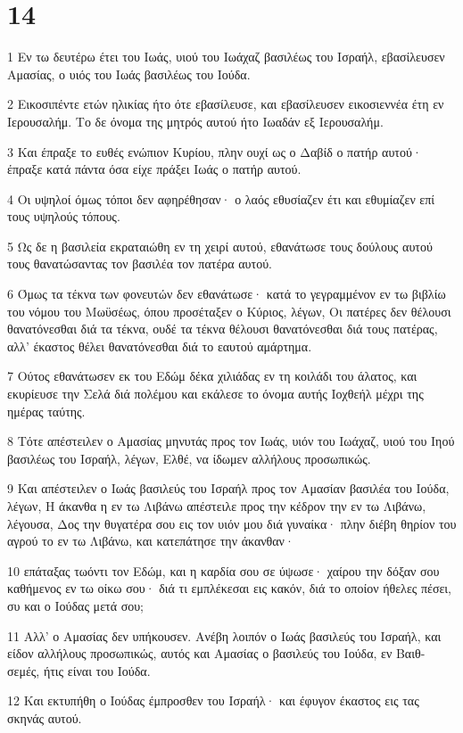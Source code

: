 \chapter{14}

\par 1 Εν τω δευτέρω έτει του Ιωάς, υιού του Ιωάχαζ βασιλέως του Ισραήλ, εβασίλευσεν Αμασίας, ο υιός του Ιωάς βασιλέως του Ιούδα.
\par 2 Εικοσιπέντε ετών ηλικίας ήτο ότε εβασίλευσε, και εβασίλευσεν εικοσιεννέα έτη εν Ιερουσαλήμ. Το δε όνομα της μητρός αυτού ήτο Ιωαδάν εξ Ιερουσαλήμ.
\par 3 Και έπραξε το ευθές ενώπιον Κυρίου, πλην ουχί ως ο Δαβίδ ο πατήρ αυτού· έπραξε κατά πάντα όσα είχε πράξει Ιωάς ο πατήρ αυτού.
\par 4 Οι υψηλοί όμως τόποι δεν αφηρέθησαν· ο λαός εθυσίαζεν έτι και εθυμίαζεν επί τους υψηλούς τόπους.
\par 5 Ως δε η βασιλεία εκραταιώθη εν τη χειρί αυτού, εθανάτωσε τους δούλους αυτού τους θανατώσαντας τον βασιλέα τον πατέρα αυτού.
\par 6 Όμως τα τέκνα των φονευτών δεν εθανάτωσε· κατά το γεγραμμένον εν τω βιβλίω του νόμου του Μωϋσέως, όπου προσέταξεν ο Κύριος, λέγων, Οι πατέρες δεν θέλουσι θανατόνεσθαι διά τα τέκνα, ουδέ τα τέκνα θέλουσι θανατόνεσθαι διά τους πατέρας, αλλ' έκαστος θέλει θανατόνεσθαι διά το εαυτού αμάρτημα.
\par 7 Ούτος εθανάτωσεν εκ του Εδώμ δέκα χιλιάδας εν τη κοιλάδι του άλατος, και εκυρίευσε την Σελά διά πολέμου και εκάλεσε το όνομα αυτής Ιοχθεήλ μέχρι της ημέρας ταύτης.
\par 8 Τότε απέστειλεν ο Αμασίας μηνυτάς προς τον Ιωάς, υιόν του Ιωάχαζ, υιού του Ιηού βασιλέως του Ισραήλ, λέγων, Ελθέ, να ίδωμεν αλλήλους προσωπικώς.
\par 9 Και απέστειλεν ο Ιωάς βασιλεύς του Ισραήλ προς τον Αμασίαν βασιλέα του Ιούδα, λέγων, Η άκανθα η εν τω Λιβάνω απέστειλε προς την κέδρον την εν τω Λιβάνω, λέγουσα, Δος την θυγατέρα σου εις τον υιόν μου διά γυναίκα· πλην διέβη θηρίον του αγρού το εν τω Λιβάνω, και κατεπάτησε την άκανθαν·
\par 10 επάταξας τωόντι τον Εδώμ, και η καρδία σου σε ύψωσε· χαίρου την δόξαν σου καθήμενος εν τω οίκω σου· διά τι εμπλέκεσαι εις κακόν, διά το οποίον ήθελες πέσει, συ και ο Ιούδας μετά σου;
\par 11 Αλλ' ο Αμασίας δεν υπήκουσεν. Ανέβη λοιπόν ο Ιωάς βασιλεύς του Ισραήλ, και είδον αλλήλους προσωπικώς, αυτός και Αμασίας ο βασιλεύς του Ιούδα, εν Βαιθ-σεμές, ήτις είναι του Ιούδα.
\par 12 Και εκτυπήθη ο Ιούδας έμπροσθεν του Ισραήλ· και έφυγον έκαστος εις τας σκηνάς αυτού.

